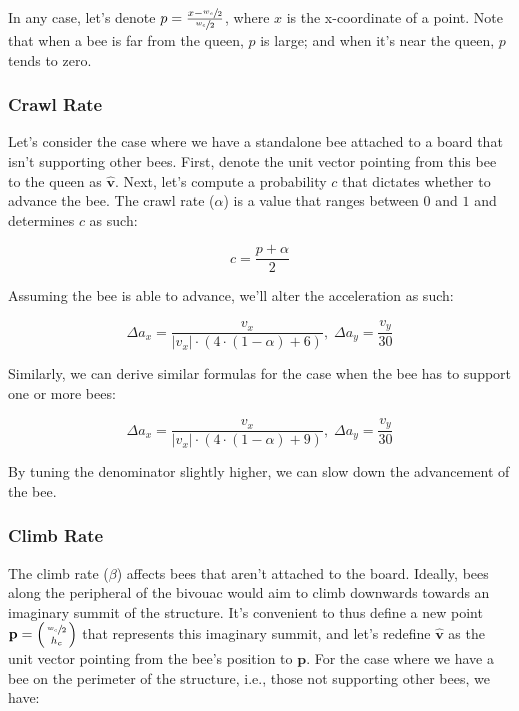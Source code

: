 \documentclass[a4paper,11pt]{article}
\begin{document}
In any case, let's denote $p = \frac{x - \sfrac{w_{c}}{2}}{\sfrac{w_{c}}{2}}$, where
$x$ is the x-coordinate of a point. Note that when a bee is far from the queen, $p$ is
large; and when it's near the queen, $p$ tends to zero.

\subsubsection{Crawl Rate}

Let's consider the case where we have a standalone bee attached to a board that isn't
supporting other bees. First, denote the unit vector pointing from this bee to the queen
as $\hat{\mathbf{v}}$. Next, let's compute a probability $c$ that dictates whether to advance the bee.
The crawl rate ($\alpha$) is a value that ranges between $0$ and $1$ and determines $c$
as such:

\begin{equation}
    c = \frac{p + \alpha}{2}
\end{equation}

Assuming the bee is able to advance, we'll alter the acceleration as such:

\begin{equation}
    \Delta a_{x} = \frac{v_{x}}{|v_{x}| \cdot (4 \cdot  (1-\alpha) + 6)}, \;
    \Delta a_{y} = \frac{v_{y}}{30}
\end{equation}

Similarly, we can derive similar formulas for the case when the bee has to support one or
more bees:

\begin{equation}
    \Delta a_{x} = \frac{v_{x}}{|v_{x}| \cdot (4 \cdot  (1-\alpha) + 9)}, \;
    \Delta a_{y} = \frac{v_{y}}{30}
\end{equation}

By tuning the denominator slightly higher, we can slow down the advancement of the bee.

\subsubsection{Climb Rate}

The climb rate ($\beta$) affects bees that aren't attached to the board. Ideally, bees along the
peripheral of the bivouac would aim to climb downwards towards an imaginary summit of the
structure. It's convenient to thus define a new point
$\mathbf{p} = \begin{psmallmatrix} \sfrac{w_{c}}{2} \\ h_{c} \end{psmallmatrix}$ that
represents this imaginary summit, and let's redefine $\hat{\mathbf{v}}$ as the unit vector pointing from the
bee's position to $\mathbf{p}$. For the case where we have a bee on the perimeter of the structure,
i.e., those not supporting other bees, we have:
\end{document}
